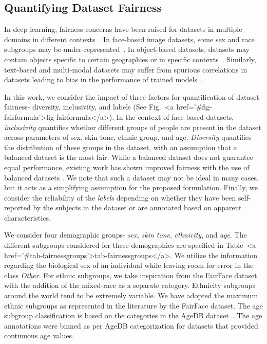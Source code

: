 \documentclass[journal]{IEEEtran}
\begin{document}
\subsection{Quantifying Dataset Fairness} In deep learning, fairness concerns have been raised for datasets in multiple domains in different contexts~\cite{cao2018vggface2,rojasdollar}. In face-based image datasets, some sex and race subgroups may be under-represented~\cite{cao2018vggface2,yi2014learning}. In object-based datasets, datasets may contain objects specific to certain geographies or in specific contexts~\cite{rojasdollar,deng2009imagenet}. Similarly, text-based and multi-modal datasets may suffer from spurious correlations in datasets leading to bias in the performance of trained models~\cite{geirhos2020shortcut}.

In this work, we consider the impact of three factors for quantification of dataset fairness- diversity, inclusivity, and labels (See Fig.~<a href='#fig-fairformula'>fig-fairformula</a>). In the context of face-based datasets, \textit{inclusivity} quantifies whether different groups of people are present in the dataset across parameters of sex, skin tone, ethnic group, and age. \textit{Diversity} quantifies the distribution of these groups in the dataset, with an assumption that a balanced dataset is the most fair. While a balanced dataset does not guarantee equal performance, existing work has shown improved fairness with the use of balanced datasets \cite{wang2021meta, ramaswamy2020fair}. We note that such a dataset may not be ideal in many cases, but it acts as a simplifying assumption for the proposed formulation. Finally, we consider the reliability of the \textit{labels} depending on whether they have been self-reported by the subjects in the dataset or are annotated based on apparent characteristics. 

We consider four demographic groups- \textit{sex}, \textit{skin tone}, \textit{ethnicity}, and \textit{age}. The different subgroups considered for these demographics are specified in Table~<a href='#tab-fairnessgroups'>tab-fairnessgroups</a>. We utilize the information regarding the biological sex of an individual while leaving room for error in the class \textit{Other}. For ethnic subgroups, we take inspiration from the FairFace dataset~\cite{karkkainen2021fairface} with the addition of the mixed-race as a separate category. Ethnicity subgroups around the world tend to be extremely variable. We have adopted the maximum ethnic subgroups as represented in the literature by the FairFace dataset. The age subgroup classification is based on the categories in the AgeDB dataset~\cite{moschoglou2017agedb}. The age annotations were binned as per AgeDB categorization for datasets that provided continuous age values.
\end{document}
